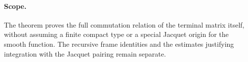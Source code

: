 \paragraph{Scope.}
The theorem proves the full commutation relation of
the terminal matrix itself, without assuming a
finite compact type or a special Jacquet origin
for the smooth function.  The recursive frame
identities and the estimates justifying integration
with the Jacquet pairing remain separate.


